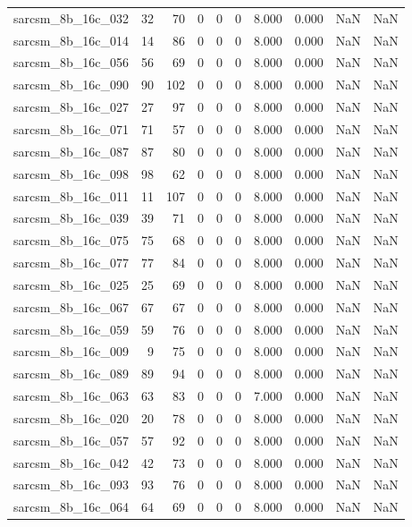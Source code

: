\documentclass{article}
\begin{document}
\begin{longtable}{lrrrrrrrrr}
sarcsm\_8b\_16c\_032 & 32 & 70 & 0 & 0 & 0 & 8.000 & 0.000 & NaN & NaN \\
sarcsm\_8b\_16c\_014 & 14 & 86 & 0 & 0 & 0 & 8.000 & 0.000 & NaN & NaN \\
sarcsm\_8b\_16c\_056 & 56 & 69 & 0 & 0 & 0 & 8.000 & 0.000 & NaN & NaN \\
sarcsm\_8b\_16c\_090 & 90 & 102 & 0 & 0 & 0 & 8.000 & 0.000 & NaN & NaN \\
sarcsm\_8b\_16c\_027 & 27 & 97 & 0 & 0 & 0 & 8.000 & 0.000 & NaN & NaN \\
sarcsm\_8b\_16c\_071 & 71 & 57 & 0 & 0 & 0 & 8.000 & 0.000 & NaN & NaN \\
sarcsm\_8b\_16c\_087 & 87 & 80 & 0 & 0 & 0 & 8.000 & 0.000 & NaN & NaN \\
sarcsm\_8b\_16c\_098 & 98 & 62 & 0 & 0 & 0 & 8.000 & 0.000 & NaN & NaN \\
sarcsm\_8b\_16c\_011 & 11 & 107 & 0 & 0 & 0 & 8.000 & 0.000 & NaN & NaN \\
sarcsm\_8b\_16c\_039 & 39 & 71 & 0 & 0 & 0 & 8.000 & 0.000 & NaN & NaN \\
sarcsm\_8b\_16c\_075 & 75 & 68 & 0 & 0 & 0 & 8.000 & 0.000 & NaN & NaN \\
sarcsm\_8b\_16c\_077 & 77 & 84 & 0 & 0 & 0 & 8.000 & 0.000 & NaN & NaN \\
sarcsm\_8b\_16c\_025 & 25 & 69 & 0 & 0 & 0 & 8.000 & 0.000 & NaN & NaN \\
sarcsm\_8b\_16c\_067 & 67 & 67 & 0 & 0 & 0 & 8.000 & 0.000 & NaN & NaN \\
sarcsm\_8b\_16c\_059 & 59 & 76 & 0 & 0 & 0 & 8.000 & 0.000 & NaN & NaN \\
sarcsm\_8b\_16c\_009 & 9 & 75 & 0 & 0 & 0 & 8.000 & 0.000 & NaN & NaN \\
sarcsm\_8b\_16c\_089 & 89 & 94 & 0 & 0 & 0 & 8.000 & 0.000 & NaN & NaN \\
sarcsm\_8b\_16c\_063 & 63 & 83 & 0 & 0 & 0 & 7.000 & 0.000 & NaN & NaN \\
sarcsm\_8b\_16c\_020 & 20 & 78 & 0 & 0 & 0 & 8.000 & 0.000 & NaN & NaN \\
sarcsm\_8b\_16c\_057 & 57 & 92 & 0 & 0 & 0 & 8.000 & 0.000 & NaN & NaN \\
sarcsm\_8b\_16c\_042 & 42 & 73 & 0 & 0 & 0 & 8.000 & 0.000 & NaN & NaN \\
sarcsm\_8b\_16c\_093 & 93 & 76 & 0 & 0 & 0 & 8.000 & 0.000 & NaN & NaN \\
sarcsm\_8b\_16c\_064 & 64 & 69 & 0 & 0 & 0 & 8.000 & 0.000 & NaN & NaN \\

\end{longtable}
\end{document}
